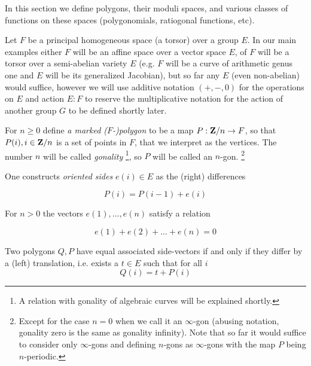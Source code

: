 In this section we define polygons,
their moduli spaces,
and various classes of functions on these spaces
(polygonomials, ratiogonal functions, etc).


Let $F$ be a principal homogeneous space (a torsor) over a group $E$.
In our main examples either $F$ will be an affine space over a vector space $E$,
of $F$ will be a torsor over a semi-abelian variety $E$
(e.g. $F$ will be a curve of arithmetic genus one and $E$ will be its generalized Jacobian),
but so far any $E$ (even non-abelian) would suffice,
however we will use additive notation $(+,-,0)$ for the operations on $E$
and action $E:F$ to reserve the multiplicative notation for the action
of another group $G$ to be defined shortly later.


\begin{definition} \label{d:marked-f-polygon}
For $n\geq 0$ define \emph{a marked ($F$-)polygon}
to be a map $P : \mathbf{Z}/n \to F$,
so that $P(i), i \in \mathbf{Z}/n$ is a set of points in $F$,
that we interpret as the vertices.
The number $n$ will be called
\emph{gonality}
\footnote{A relation with gonality of algebraic curves will be explained shortly.},
so $P$ will be called an $n$-gon.
\footnote{Except for the case $n=0$ when we call it an $\infty$-gon
(abusing notation, gonality zero is the same as gonality infinity).
Note that so far it would suffice to consider only $\infty$-gons
and defining $n$-gons as $\infty$-gons with the map $P$ being $n$-periodic.}
\end{definition}

One constructs \emph{oriented sides} $e(i) \in E$ as the (right) differences

\begin{equation} \label{eq:P2e}
P(i) = P(i-1) + e(i)
\end{equation}

For $n>0$ the vectors $e(1),...,e(n)$ satisfy a relation

\begin{equation} \label{eq:zerosum}
  e(1) + e(2) + ... + e(n) = 0       
\end{equation}

Two polygons $Q,P$ have equal associated side-vectors
if and only if they differ by a (left) translation,
i.e. exists a $t \in E$ such that for all $i$
\begin{equation} \label{eq:left-translation}
Q(i) = t + P(i)
\end{equation}

